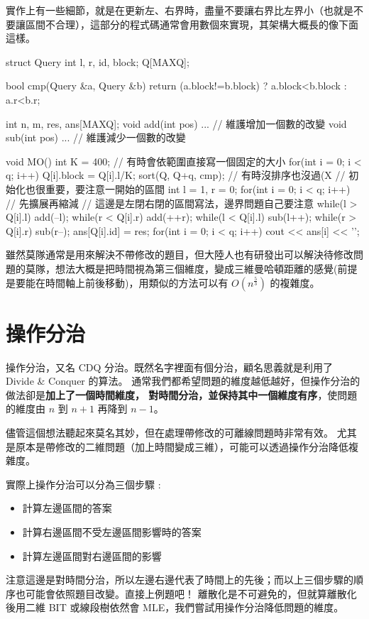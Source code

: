 \documentclass[main.tex]{subfiles}
\begin{document}
實作上有一些細節，就是在更新左、右界時，盡量不要讓右界比左界小（也就是不要讓區間不合理），這部分的程式碼通常會用數個來實現，其架構大概長的像下面這樣。

\begin{C++}
struct Query{
	int l, r, id, block;
} Q[MAXQ];

bool cmp(Query &a, Query &b){
	return (a.block!=b.block) ? a.block<b.block : a.r<b.r;
}

int n, m, res, ans[MAXQ];
void add(int pos){ ... } // 維護增加一個數的改變
void sub(int pos){ ... } // 維護減少一個數的改變

void MO(){
	int K = 400; // 有時會依範圍直接寫一個固定的大小
	for(int i = 0; i < q; i++) Q[i].block = Q[i].l/K;
	sort(Q, Q+q, cmp); // 有時沒排序也沒過(X
	// 初始化也很重要，要注意一開始的區間
	int l = 1, r = 0;
	for(int i = 0; i < q; i++){
		// 先擴展再縮減
		// 這邊是左閉右閉的區間寫法，邊界問題自己要注意
		while(l > Q[i].l) add(--l);
		while(r < Q[i].r) add(++r);
		while(l < Q[i].l) sub(l++);
		while(r > Q[i].r) sub(r--);
		ans[Q[i].id] = res;
	}
	for(int i = 0; i < q; i++) cout << ans[i] << '\n';
}
\end{C++}

雖然莫隊通常是用來解決不帶修改的題目，但大陸人也有研發出可以解決待修改問題的莫隊，想法大概是把時間視為第三個維度，變成三維曼哈頓距離的感覺(前提是要能在時間軸上前後移動)，用類似的方法可以有 $O(n^\frac{5}{3})$ 的複雜度。
\section{操作分治}
操作分治，又名 CDQ 分治。既然名字裡面有個分治，顧名思義就是利用了 Divide \& Conquer 的算法。
通常我們都希望問題的維度越低越好，但操作分治的做法卻是\textbf{加上了一個時間維度，
對時間分治，並保持其中一個維度有序}，使問題的維度由 $n$ 到 $n+1$ 再降到 $n-1$。

儘管這個想法聽起來莫名其妙，但在處理帶修改的可離線問題時非常有效。
尤其是原本是帶修改的二維問題（加上時間變成三維），可能可以透過操作分治降低複雜度。

實際上操作分治可以分為三個步驟 :
\begin{itemize}
\item 計算左邊區間的答案
\item 計算右邊區間不受左邊區間影響時的答案
\item 計算左邊區間對右邊區間的影響
\end{itemize}
注意這邊是對時間分治，所以左邊右邊代表了時間上的先後；而以上三個步驟的順序也可能會依照題目改變。直接上例題吧！
離散化是不可避免的，但就算離散化後用二維 BIT 或線段樹依然會 MLE，我們嘗試用操作分治降低問題的維度。
\end{document}
